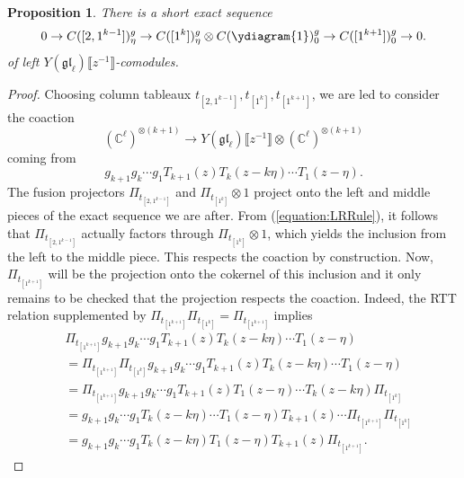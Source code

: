 \documentclass[11pt]{report}
\newtheorem{prop}[theorem]{Proposition}
\theoremstyle{definition}
\theoremstyle{remark}
\theoremstyle{remark}
\newcommand{\C}{\mathbb{C}}
\begin{document}
\begin{prop}
There is a short exact sequence
\begin{equation*}
0 \to C([2,1^{k-1}])_\eta^g \to C([1^k])_\eta^g \otimes C(\ydiagram{1})_0^g \to C([1^{k+1}])_0^g \to 0.
\end{equation*}
of left $Y(\mathfrak{gl}_\ell)\llbracket z^{-1} \rrbracket$-comodules.
\end{prop}

\begin{proof}
Choosing column tableaux $t_{[2,1^{k-1}]},t_{[1^k]},t_{[1^{k+1}]}$, we are led to consider the coaction
\begin{equation*}
(\C^\ell)^{\otimes (k+1)} \to Y(\mathfrak{gl}_\ell)\llbracket z^{-1} \rrbracket \otimes (\C^\ell)^{\otimes (k+1)}
\end{equation*}
coming from
\begin{equation*}
g_{k+1} g_k \cdots g_1 T_{k+1}(z) T_k(z-k\eta) \cdots T_1(z-\eta).
\end{equation*}
The fusion projectors $\Pi_{t_{[2,1^{k-1}]}}$ and $\Pi_{t_{[1^k]}} \otimes 1$ project onto the left and middle pieces of the exact sequence we are after. From (\ref{equation:LRRule}), it follows that $\Pi_{t_{[2,1^{k-1}]}}$ actually factors through $\Pi_{t_{[1^k]}} \otimes 1$, which yields the inclusion from the left to the middle piece. This respects the coaction by construction. Now, $\Pi_{t_{[1^{k+1}]}}$ will be the projection onto the cokernel of this inclusion and it only remains to be checked that the projection respects the coaction. Indeed, the RTT relation supplemented by $\Pi_{t_{[1^{k+1}]}} \Pi_{t_{[1^k]}} = \Pi_{t_{[1^{k+1}]}}$ implies
\begin{align*}
&\Pi_{t_{[1^{k+1}]}} g_{k+1} g_k \cdots g_1 T_{k+1}(z) T_k(z-k\eta) \cdots T_1(z-\eta) \\
&= \Pi_{t_{[1^{k+1}]}} \Pi_{t_{[1^k]}} g_{k+1} g_k \cdots g_1 T_{k+1}(z) T_k(z-k\eta) \cdots T_1(z-\eta) \\
&= \Pi_{t_{[1^{k+1}]}}  g_{k+1} g_k \cdots g_1 T_{k+1}(z) T_1(z-\eta) \cdots T_k(z-k\eta) \Pi_{t_{[1^k]}} \\
&=  g_{k+1} g_k \cdots g_1 T_k(z-k\eta) \cdots T_1(z-\eta) T_{k+1}(z) \cdots \Pi_{t_{[1^{k+1}]}} \Pi_{t_{[1^k]}} \\
&=  g_{k+1} g_k \cdots g_1 T_k(z-k\eta) T_1(z-\eta) T_{k+1}(z) \Pi_{t_{[1^{k+1}]}}.
\end{align*}
\end{proof}
\end{document}
